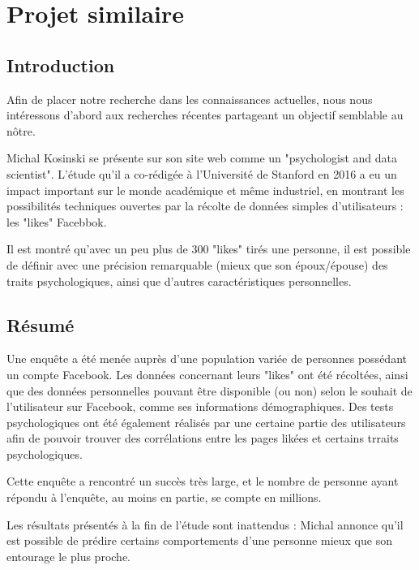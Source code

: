 
\section{Projet similaire}

	\subsection{Introduction}

		Afin de placer notre recherche dans les connaissances actuelles, nous nous intéressons d'abord aux recherches récentes partageant un objectif semblable au nôtre.

		Michal Kosinski se présente sur son site web\cite{michal-kosinski} comme un "psychologist and data scientist". L'étude qu'il a co-rédigée à l'Université de Stanford en 2016 a eu un impact important sur le monde académique et même industriel, en montrant les possibilités techniques ouvertes par la récolte de données simples d'utilisateurs : les "likes" Facebbok.

		Il est montré qu'avec un peu plus de 300 "likes" tirés une personne, il est possible de définir avec une précision remarquable (mieux que son époux/épouse) des traits psychologiques, ainsi que d'autres caractéristiques personnelles.

	\subsection{Résumé}

		Une enquête a été menée auprès d'une population variée de personnes possédant un compte Facebook. Les données concernant leurs "likes" ont été récoltées, ainsi que des données personnelles pouvant être disponible (ou non) selon le souhait de l'utilisateur sur Facebook, comme ses informations démographiques. Des tests psychologiques ont été également réalisés par une certaine partie des utilisateurs afin de pouvoir trouver des corrélations entre les pages likées et certains trraits psychologiques.

		Cette enquête a rencontré un succès très large, et le nombre de personne ayant répondu à l'enquête, au moins en partie, se compte en millions.

		Les résultats présentés à la fin de l'étude sont inattendus : Michal annonce qu'il est possible de prédire certains comportements d'une personne mieux que son entourage le plus proche.

